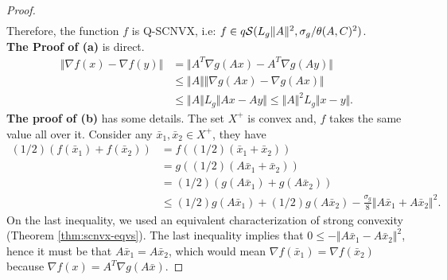 \documentclass[12pt]{report}
\begin{document}
\begin{proof}
\begin{align*}
                \end{align*}
                Therefore, the function $f$ is Q-SCNVX, i.e: $f \in q\mathcal{S} (L_g \Vert A\Vert^2, \sigma_g/\theta(A, C)^2)$. 
                \\\noindent
                \textbf{The Proof of (a)} is direct. 
                \begin{align*}
                    \Vert \nabla f(x) - \nabla f(y)\Vert &= \Vert A^T \nabla g(Ax) - A^T\nabla g(Ay)\Vert
                    \\
                    &\le \Vert A\Vert \Vert \nabla g(Ax) - \nabla g(Ax)\Vert
                    \\
                    &\le \Vert A\Vert L_g \Vert Ax - Ay\Vert \le \Vert A\Vert^2 L_g \Vert x - y\Vert. 
                \end{align*}
                \textbf{The proof of (b)} has some details. 
                The set $X^+$ is convex and, $f$ takes the same value all over it. 
                Consider any $\bar x_1, \bar x_2 \in X^+$, they have
                \begin{align*}
                    (1/2)(f(\bar x_1) + f(\bar x_2)) &= f((1/2)(\bar x_1 + \bar x_2)) 
                    \\
                    &= g((1/2)(A\bar x_1 + \bar x_2)) 
                    \\
                    &= (1/2)(g(A\bar x_1) + g(A \bar x_2))
                    \\
                    &\le (1/2)g(A \bar x_1) + (1/2)g(A \bar x_2) - \frac{\sigma_g}{8}\Vert A\bar x_1 + A \bar x_2\Vert^2. 
                \end{align*}
                On the last inequality, we used an equivalent characterization of strong convexity (Theorem \ref{thm:scnvx-eqvs}). 
                The last inequality implies that $0 \le - \Vert A \bar x_1 - A \bar x_2\Vert^2$, hence it must be that $A\bar x_1 = A \bar x_2$, which would mean $\nabla f(\bar x_1) = \nabla f(\bar x_2)$ because $\nabla f(x) = A^T \nabla g(A \bar x)$. 
            \end{proof}
            
\end{document}
